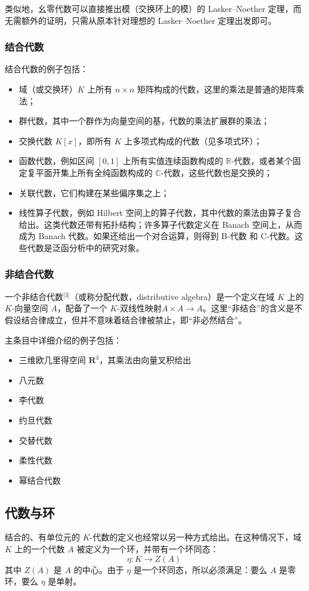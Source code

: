类似地，幺零代数可以直接推出模（交换环上的模）的 Lasker–Noether 定理，而无需额外的证明，只需从原本针对理想的 Lasker–Noether 定理出发即可。
\subsubsection{结合代数}
结合代数的例子包括：
\begin{itemize}
\item 域（或交换环）$K$ 上所有 $n \times n$ 矩阵构成的代数，这里的乘法是普通的矩阵乘法；
\item 群代数，其中一个群作为向量空间的基，代数的乘法扩展群的乘法；
\item 交换代数 $K[x]$，即所有 $K$ 上多项式构成的代数（见多项式环）；
\item 函数代数，例如区间 $[0,1]$ 上所有实值连续函数构成的 $\mathbb{R}$-代数，或者某个固定复平面开集上所有全纯函数构成的 $\mathbb{C}$-代数，这些代数也是交换的；
\item 关联代数，它们构建在某些偏序集之上；
\item 线性算子代数，例如 Hilbert 空间上的算子代数，其中代数的乘法由算子复合给出。这类代数还带有拓扑结构；许多算子代数定义在 Banach 空间上，从而成为 Banach 代数。如果还给出一个对合运算，则得到 B\*-代数 和 C\*-代数。这些代数是泛函分析中的研究对象。
\end{itemize}
\subsubsection{非结合代数}
一个非结合代数\(^\text{[3]}\)（或称分配代数，distributive algebra）是一个定义在域 $K$ 上的 $K$-向量空间 $A$，配备了一个 $K$-双线性映射$A \times A \to A$。这里“非结合”的含义是不假设结合律成立，但并不意味着结合律被禁止，即“非必然结合”。

主条目中详细介绍的例子包括：
\begin{itemize}
\item 三维欧几里得空间 $\mathbf{R}^3$，其乘法由向量叉积给出
\item 八元数
\item 李代数
\item 约旦代数
\item 交替代数
\item 柔性代数
\item 幂结合代数
\end{itemize}
\subsection{代数与环}
结合的、有单位元的 $K$-代数的定义也经常以另一种方式给出。在这种情况下，域 $K$ 上的一个代数 $A$ 被定义为一个环，并带有一个环同态：
$$
\eta : K \to Z(A)~
$$
其中 $Z(A)$ 是 $A$ 的中心。由于 $\eta$ 是一个环同态，所以必须满足：要么 $A$ 是零环，要么 $\eta$ 是单射。

